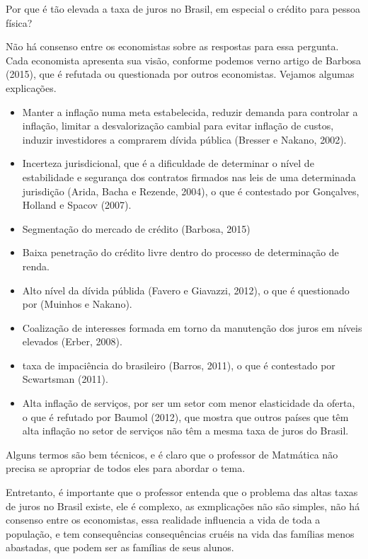 \begin{paginatexto2}
Por que é tão elevada a taxa de juros no Brasil, em especial o crédito para pessoa física?

Não há consenso entre os economistas sobre as respostas para essa pergunta. Cada economista apresenta sua visão, conforme podemos verno artigo de Barbosa (2015), que é refutada ou questionada por outros economistas. Vejamos algumas explicações.

\begin{itemize}
  \item Manter a inflação numa meta estabelecida, reduzir demanda para controlar a inflação, limitar a desvalorização cambial para evitar inflação de custos, induzir investidores a comprarem dívida pública (Bresser e Nakano, 2002).

  \item Incerteza jurisdicional, que é a dificuldade de determinar o nível de estabilidade e segurança dos contratos firmados nas leis de uma determinada jurisdição (Arida, Bacha e Rezende, 2004), o que é contestado por Gonçalves, Holland e Spacov (2007).

  \item Segmentação do mercado de crédito (Barbosa, 2015)

  \item Baixa penetração do crédito livre dentro do processo de determinação de renda.

  \item Alto nível da dívida públida (Favero e Giavazzi, 2012), o que é questionado por (Muinhos e Nakano).

  \item  Coalização de interesses formada em torno da manutenção dos juros em níveis elevados (Erber, 2008).

  \item taxa de impaciência do brasileiro (Barros, 2011), o que é contestado por Scwartsman (2011).

  \item Alta inflação de serviços, por ser um setor com menor elasticidade da oferta, o que é refutado por Baumol (2012), que mostra que outros países que têm alta inflação no setor de serviços não têm a mesma taxa de juros do Brasil.
\end{itemize}

Alguns termos são bem técnicos, e é claro que o professor de Matmática não precisa se apropriar de todos eles para abordar o tema.

Entretanto, é importante que o professor entenda que o problema das altas taxas de juros no Brasil existe, ele é complexo, as exmplicações não são simples, não há consenso entre os economistas, essa realidade influencia a vida de toda a população, e tem consequências consequências cruéis na vida das famílias menos abastadas, que podem ser as famílias de seus alunos.
\end{paginatexto2}


